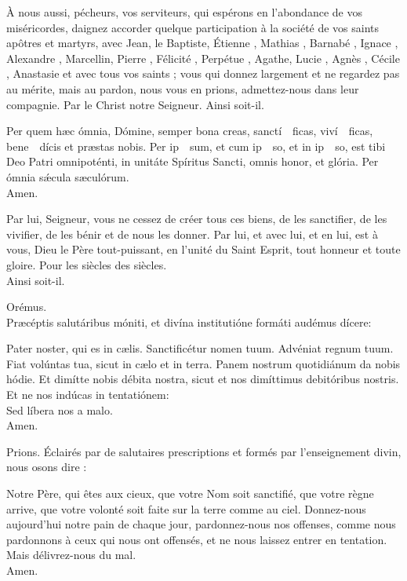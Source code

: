 \documentclass[twoside]{article}
\begin{document}
\begin{paracol}{2}
\switchcolumn

À nous aussi, pécheurs, vos serviteurs, qui espérons en l’abondance de vos miséricordes, daignez accorder quelque participation à la société de vos saints apôtres et martyrs, avec Jean, le Baptiste, Étienne , Mathias , Barnabé , Ignace , Alexandre , Marcellin, Pierre , Félicité , Perpétue , Agathe, Lucie , Agnès , Cécile , Anastasie et avec tous vos saints ; vous qui donnez largement et ne regardez pas au mérite, mais au pardon, nous vous en prions, admettez-nous dans leur compagnie. Par le Christ notre Seigneur. Ainsi soit-il.

\switchcolumn*

Per quem hæc ómnia, Dómine, semper bona creas, sanctí~\cc~ficas, viví~\cc~ficas, bene~\cc~dícis et præstas nobis.
Per ip~\cc~sum, et cum ip~\cc~so, et in ip~\cc~so, est tibi Deo Patri \cc omnipoténti, in unitáte Spíritus \cc Sancti,
omnis honor, et glória.
Per ómnia sǽcula sæculórum. \\
\rr Amen.

\switchcolumn

Par lui, Seigneur, vous ne cessez de créer tous ces biens, de les sanctiﬁer, de les viviﬁer, de les bénir et de nous les donner.
Par lui, et avec lui, et en lui, est à vous, Dieu le Père tout-puissant, en l’unité du Saint Esprit,
tout honneur et toute gloire.
Pour les siècles des siècles.\\
\rr Ainsi soit-il.

\switchcolumn*

Orémus. \\
Præcéptis salutáribus móniti, et divína institutióne formáti audémus dícere:

Pater noster, qui es in cælis. Sanctificétur nomen tuum. Advéniat regnum tuum. Fiat volúntas tua, sicut in cælo et in terra. Panem nostrum quotidiánum da nobis hódie. Et dimítte nobis débita nostra, sicut et nos dimíttimus debitóribus nostris. Et ne nos indúcas in tentatiónem:\\
\rr Sed líbera nos a malo.\\
\vv Amen.

\switchcolumn

Prions. Éclairés par de salutaires prescriptions et formés par l’enseignement divin, nous osons dire :

Notre Père, qui êtes aux cieux, que votre Nom soit sanctifié, que votre règne arrive, que votre volonté soit faite sur la terre comme au ciel. Donnez-nous aujourd’hui notre pain de chaque jour, pardonnez-nous nos offenses, comme nous pardonnons à ceux qui nous ont offensés, et ne nous laissez entrer en tentation. \\
\rr Mais délivrez-nous du mal.\\
\vv Amen.


\end{paracol}
\end{document}
